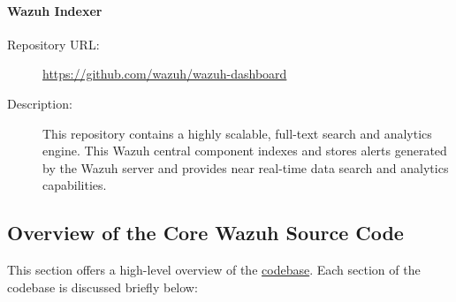 \paragraph*{Wazuh Indexer}
\begin{description}
    \item[Repository URL:] \url{https://github.com/wazuh/wazuh-dashboard}
    \item[Description:] This repository contains a highly scalable, full-text search and analytics engine. This Wazuh central component indexes and stores alerts generated by the Wazuh server and provides near real-time data search and analytics capabilities.
\end{description}

\subsection{Overview of the Core Wazuh Source Code}
This section offers a high-level overview of the \href{https://github.com/wazuh/wazuh}{codebase}. Each section of the codebase is discussed briefly below:

